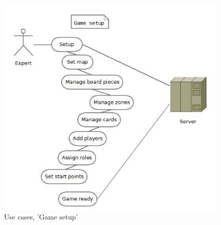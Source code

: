 \begin{figure}[H]
  \centering
    \includegraphics[width=1.0\textwidth]{img/gamesetup.jpg}
  \caption{Use cases, 'Game setup'} 
  \label{fig:gamesetup}
\end{figure}


